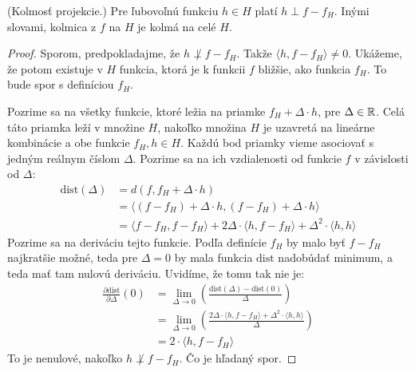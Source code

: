 \begin{lemma} \label{lem:projperp}
  (Kolmosť projekcie.) Pre ľubovoľnú funkciu $h \in H$ platí $h \perp f - f_H$.
  Inými slovami, kolmica z $f$ na $H$ je kolmá na celé $H$.
\end{lemma}
\begin{proof}
  Sporom, predpokladajme, že $h \not\perp f - f_H$. Takže
  $\langle h, f - f_H \rangle \neq 0$. Ukážeme, že potom existuje
  v $H$ funkcia, ktorá je k funkcii $f$ bližšie, ako funkcia $f_H$.
  To bude spor s definíciou $f_H$.
  
  Pozrime sa na všetky funkcie, ktoré ležia na priamke
  $f_H + \Delta \cdot h$, pre $\Delta \in \mathbb{R}$. Celá táto priamka leží
  v množine $H$, nakoľko množina $H$ je uzavretá na lineárne kombinácie
  a obe funkcie $f_H, h \in H$. Každú bod priamky vieme asociovať
  s jedným reálnym číslom $\Delta$. Pozrime sa na ich vzdialenosti od
  funkcie $f$ v závislosti od $\Delta$:
  \begin{align}
    \text{dist}(\Delta)
      &= d(f, f_H + \Delta \cdot h) \\
      &= \langle (f - f_H) + \Delta \cdot h, (f - f_H) + \Delta \cdot h \rangle \\
      &= \langle f - f_H, f - f_H \rangle + 2\Delta \cdot \langle h, f - f_H \rangle + \Delta^2 \cdot \langle h, h \rangle
  \end{align}
  Pozrime sa na deriváciu tejto funkcie. Podľa definície $f_H$ by
  malo byť $f - f_H$ najkratšie možné, teda pre $\Delta = 0$ by mala
  funkcia $\text{dist}$ nadobúdať minimum, a teda mať tam nulovú
  deriváciu. Uvidíme, že tomu tak nie je:
  \begin{align}
    \frac{\partial \text{dist}}{\partial \Delta} \left( 0 \right)
      &= \lim_{\Delta \to 0} \left( \frac{\text{dist}(\Delta) - \text{dist}(0)}{\Delta} \right) \\
      &= \lim_{\Delta \to 0} \left( \frac{2\Delta \cdot \langle h, f - f_H \rangle + \Delta^2 \cdot \langle h, h \rangle}{\Delta} \right) \\
      &= 2 \cdot \langle h, f - f_H \rangle
  \end{align}
  To je nenulové, nakoľko $h \not \perp f - f_H$. Čo je hľadaný spor.
\end{proof}

